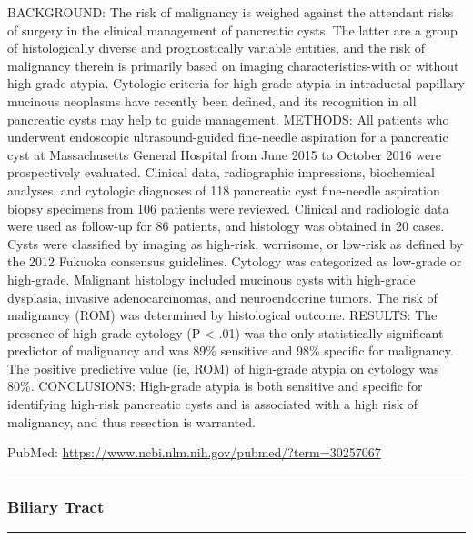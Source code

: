 \documentclass[]{article}
\begin{document}
BACKGROUND: The risk of malignancy is weighed against the attendant
risks of surgery in the clinical management of pancreatic cysts. The
latter are a group of histologically diverse and prognostically variable
entities, and the risk of malignancy therein is primarily based on
imaging characteristics-with or without high-grade atypia. Cytologic
criteria for high-grade atypia in intraductal papillary mucinous
neoplasms have recently been defined, and its recognition in all
pancreatic cysts may help to guide management. METHODS: All patients who
underwent endoscopic ultrasound-guided fine-needle aspiration for a
pancreatic cyst at Massachusetts General Hospital from June 2015 to
October 2016 were prospectively evaluated. Clinical data, radiographic
impressions, biochemical analyses, and cytologic diagnoses of 118
pancreatic cyst fine-needle aspiration biopsy specimens from 106
patients were reviewed. Clinical and radiologic data were used as
follow-up for 86 patients, and histology was obtained in 20 cases. Cysts
were classified by imaging as high-risk, worrisome, or low-risk as
defined by the 2012 Fukuoka consensus guidelines. Cytology was
categorized as low-grade or high-grade. Malignant histology included
mucinous cysts with high-grade dysplasia, invasive adenocarcinomas, and
neuroendocrine tumors. The risk of malignancy (ROM) was determined by
histological outcome. RESULTS: The presence of high-grade cytology (P
\textless{} .01) was the only statistically significant predictor of
malignancy and was 89\% sensitive and 98\% specific for malignancy. The
positive predictive value (ie, ROM) of high-grade atypia on cytology was
80\%. CONCLUSIONS: High-grade atypia is both sensitive and specific for
identifying high-risk pancreatic cysts and is associated with a high
risk of malignancy, and thus resection is warranted.

PubMed: \url{https://www.ncbi.nlm.nih.gov/pubmed/?term=30257067}

{}

{}

\begin{center}\rule{0.5\linewidth}{\linethickness}\end{center}

\hypertarget{biliary-tract-1}{%
\subsubsection{Biliary Tract}\label{biliary-tract-1}}

\begin{center}\rule{0.5\linewidth}{\linethickness}\end{center}
\end{document}
